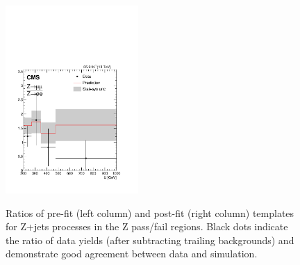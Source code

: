 \begin{figure}
\includegraphics[width=0.45\textwidth]{figures/pullsImpact/ratio_zmm_zee_shapes_fit_b.pdf}\\
\caption{Ratios of pre-fit (left column) and post-fit (right column) templates for Z+jets processes in the Z pass/fail regions. Black dots indicate the ratio of data yields (after subtracting trailing backgrounds) and demonstrate good agreement between data and simulation.}
\label{wwratios}
\end{figure}

\clearpage

